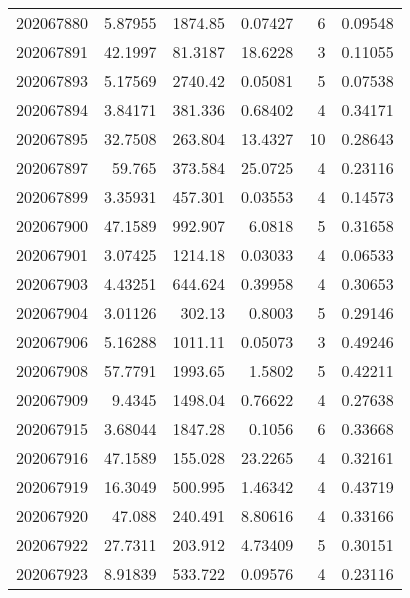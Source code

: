 \begin{tabular}{rrrrrr}
 202067880 &          5.87955 &     1874.85   &            0.07427 &           6 & 0.09548 \\
 202067891 &         42.1997  &       81.3187 &           18.6228  &           3 & 0.11055 \\
 202067893 &          5.17569 &     2740.42   &            0.05081 &           5 & 0.07538 \\
 202067894 &          3.84171 &      381.336  &            0.68402 &           4 & 0.34171 \\
 202067895 &         32.7508  &      263.804  &           13.4327  &          10 & 0.28643 \\
 202067897 &         59.765   &      373.584  &           25.0725  &           4 & 0.23116 \\
 202067899 &          3.35931 &      457.301  &            0.03553 &           4 & 0.14573 \\
 202067900 &         47.1589  &      992.907  &            6.0818  &           5 & 0.31658 \\
 202067901 &          3.07425 &     1214.18   &            0.03033 &           4 & 0.06533 \\
 202067903 &          4.43251 &      644.624  &            0.39958 &           4 & 0.30653 \\
 202067904 &          3.01126 &      302.13   &            0.8003  &           5 & 0.29146 \\
 202067906 &          5.16288 &     1011.11   &            0.05073 &           3 & 0.49246 \\
 202067908 &         57.7791  &     1993.65   &            1.5802  &           5 & 0.42211 \\
 202067909 &          9.4345  &     1498.04   &            0.76622 &           4 & 0.27638 \\
 202067915 &          3.68044 &     1847.28   &            0.1056  &           6 & 0.33668 \\
 202067916 &         47.1589  &      155.028  &           23.2265  &           4 & 0.32161 \\
 202067919 &         16.3049  &      500.995  &            1.46342 &           4 & 0.43719 \\
 202067920 &         47.088   &      240.491  &            8.80616 &           4 & 0.33166 \\
 202067922 &         27.7311  &      203.912  &            4.73409 &           5 & 0.30151 \\
 202067923 &          8.91839 &      533.722  &            0.09576 &           4 & 0.23116 \\

\end{tabular}
